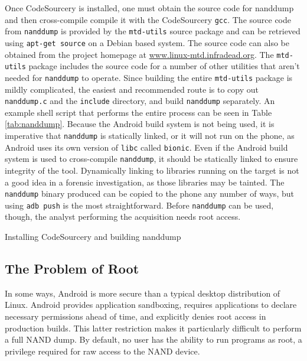 Once CodeSourcery is installed, one must obtain the source code for nanddump and then cross-compile compile it with the CodeSourcery
\texttt{gcc}.  The source code from \texttt{nanddump} is provided by the \texttt{mtd-utils} source package and can be retrieved
using \texttt{apt-get source} on a Debian based system.  The source code can also be obtained from the project homepage at
\url{www.linux-mtd.infradead.org}.  The \texttt{mtd-utils} package includes the source code for a number of other utilities that
aren't needed for \texttt{nanddump} to operate.  Since building the entire \texttt{mtd-utils} package is mildly complicated, the
easiest and recommended route is to copy out \texttt{nanddump.c} and the \texttt{include} directory, and build \texttt{nanddump}
separately.  An example shell script that performs the entire process can be seen in Table \ref{tab:nanddump}.  Because the Android
build system is not being used, it is imperative that \texttt{nanddump} is statically linked, or it will not run on the phone, as
Android uses its own version of \texttt{libc} called \texttt{bionic}.  Even if the Android build system is used to cross-compile
\texttt{nanddump}, it should be statically linked to ensure integrity of the tool.  Dynamically linking to libraries running on the
target is not a good idea in a forensic investigation, as those libraries may be tainted.  The \texttt{nanddump} binary produced can
be copied to the phone any number of ways, but using \texttt{adb push} is the most straightforward.  Before \texttt{nanddump} can be
used, though, the analyst performing the acquisition needs root access.

\begin{table}[htpb]

\caption{Installing CodeSourcery and building nanddump}
\label{tab:nanddump}
\end{table}

\subsection{The Problem of Root}
In some ways, Android is more secure than a typical desktop distribution of Linux.  Android provides application sandboxing,
requires applications to declare necessary permissions ahead of time, and explicitly denies root access in production builds. This
latter restriction makes it particularly difficult to perform a full NAND dump.  By default, no user has the ability to run programs
as root, a privilege required for raw access to the NAND device.  

